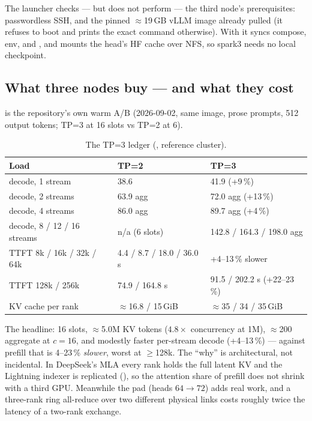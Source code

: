 The launcher checks --- but does not perform --- the third node's
prerequisites: passwordless SSH, and the pinned $\approx$19\,GB vLLM image
already pulled (it refuses to boot and prints the exact 
command otherwise). With  it syncs compose,
env, and , and mounts the head's HF cache over NFS, so
spark3 needs no local checkpoint.

\subsection{What three nodes buy --- and what they cost}

 is the repository's own warm A/B (2026-09-02, same image,
prose prompts, 512 output tokens; TP=3 at 16 slots vs TP=2 at 6).

\begin{table}[htbp]
\centering\small
\caption{The TP=3 ledger (, reference cluster).}
\label{tab:tp3-ledger}
\begin{tabular}{lll}
\toprule
Load & TP=2 & TP=3 \\
\midrule
decode, 1 stream & 38.6 \tokspersec{} & 41.9 \tokspersec{} (+9\,\%) \\
decode, 2 streams & 63.9 agg & 72.0 agg (+13\,\%) \\
decode, 4 streams & 86.0 agg & 89.7 agg (+4\,\%) \\
decode, 8 / 12 / 16 streams & n/a (6 slots) & 142.8 / 164.3 / 198.0 agg \\
TTFT 8k / 16k / 32k / 64k & 4.4 / 8.7 / 18.0 / 36.0 s & +4--13\,\% slower \\
TTFT 128k / 256k & 74.9 / 164.8 s & 91.5 / 202.2 s (+22--23\,\%) \\
KV cache per rank & $\approx$16.8 / 15\,GiB & $\approx$35 / 34 / 35\,GiB \\
\bottomrule
\end{tabular}
\end{table}

The headline: 16 slots, $\approx$5.0M KV tokens ($4.8\times$ concurrency at
1M), $\approx$200 \tokspersec{} aggregate at $c{=}16$, and modestly faster
per-stream decode (+4--13\,\%) --- against prefill that is 4--23\,\%
\emph{slower}, worst at $\ge$128k. The ``why'' is architectural, not
incidental. In DeepSeek's MLA every rank holds the full latent KV and the
Lightning indexer is replicated (), so the attention
share of prefill does not shrink with a third GPU. Meanwhile the pad (heads
$64 \to 72$) adds real work, and a three-rank ring all-reduce over two
different physical links costs roughly twice the latency of a two-rank
exchange.

